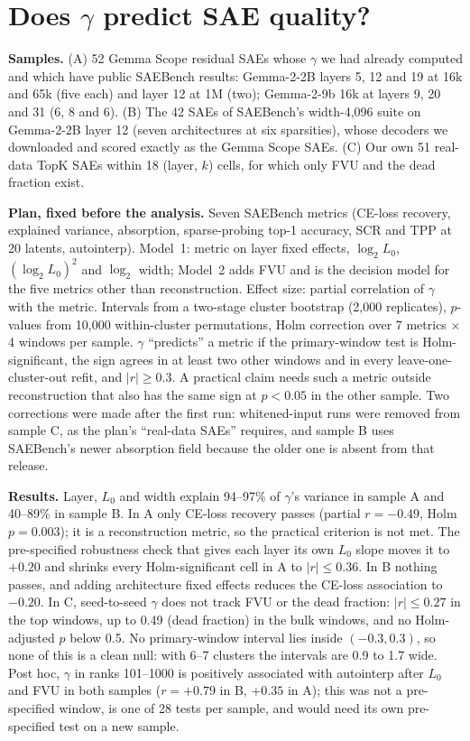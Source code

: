 \documentclass{article}
\newcommand{\Lz}{L_0}
\begin{document}
\section{Does $\gamma$ predict SAE quality?}
\label{app:quality}

\textbf{Samples.} (A) 52 Gemma Scope residual SAEs whose $\gamma$ we had already computed and which have public SAEBench results: Gemma-2-2B layers 5, 12 and 19 at 16k and 65k (five each) and layer 12 at 1M (two); Gemma-2-9b 16k at layers 9, 20 and 31 (6, 8 and 6). (B) The 42 SAEs of SAEBench's width-4,096 suite on Gemma-2-2B layer 12 (seven architectures at six sparsities), whose decoders we downloaded and scored exactly as the Gemma Scope SAEs. (C) Our own 51 real-data TopK SAEs within 18 (layer, $k$) cells, for which only FVU and the dead fraction exist.

\textbf{Plan, fixed before the analysis.} Seven SAEBench metrics (CE-loss recovery, explained variance, absorption, sparse-probing top-1 accuracy, SCR and TPP at 20 latents, autointerp). Model~1: metric on layer fixed effects, $\log_2\Lz$, $(\log_2\Lz)^2$ and $\log_2$ width; Model~2 adds FVU and is the decision model for the five metrics other than reconstruction. Effect size: partial correlation of $\gamma$ with the metric. Intervals from a two-stage cluster bootstrap (2,000 replicates), $p$-values from 10,000 within-cluster permutations, Holm correction over 7 metrics $\times$ 4 windows per sample. $\gamma$ ``predicts'' a metric if the primary-window test is Holm-significant, the sign agrees in at least two other windows and in every leave-one-cluster-out refit, and $|r|\ge 0.3$. A practical claim needs such a metric outside reconstruction that also has the same sign at $p<0.05$ in the other sample. Two corrections were made after the first run: whitened-input runs were removed from sample C, as the plan's ``real-data SAEs'' requires, and sample B uses SAEBench's newer absorption field because the older one is absent from that release.

\textbf{Results.} Layer, $\Lz$ and width explain 94--97\% of $\gamma$'s variance in sample A and 40--89\% in sample B. In A only CE-loss recovery passes (partial $r=-0.49$, Holm $p=0.003$); it is a reconstruction metric, so the practical criterion is not met. The pre-specified robustness check that gives each layer its own $\Lz$ slope moves it to $+0.20$ and shrinks every Holm-significant cell in A to $|r|\le 0.36$. In B nothing passes, and adding architecture fixed effects reduces the CE-loss association to $-0.20$. In C, seed-to-seed $\gamma$ does not track FVU or the dead fraction: $|r|\le 0.27$ in the top windows, up to 0.49 (dead fraction) in the bulk windows, and no Holm-adjusted $p$ below 0.5. No primary-window interval lies inside $(-0.3, 0.3)$, so none of this is a clean null: with 6--7 clusters the intervals are 0.9 to 1.7 wide. Post hoc, $\gamma$ in ranks 101--1000 is positively associated with autointerp after $\Lz$ and FVU in both samples ($r=+0.79$ in B, $+0.35$ in A); this was not a pre-specified window, is one of 28 tests per sample, and would need its own pre-specified test on a new sample.
\end{document}
